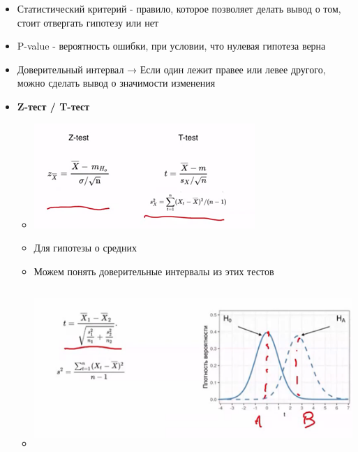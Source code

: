 \documentclass[a4paper, 12pt]{article}
\begin{document}
\begin{itemize}
\item
  
  Статистический критерий - правило, которое позволяет делать вывод о
  том, стоит отвергать гипотезу или нет
  
\item
  
  P-value - вероятность ошибки, при условии, что нулевая гипотеза верна
  
\item
  
  Доверительный интервал → Если один лежит правее или левее другого,
  можно сделать вывод о значимости изменения
  
\item
  
  \textbf{Z-тест / T-тест}
  

  \begin{itemize}
  \item
    
    \includegraphics[width=3.29167in,height=1.56443in]{media/image18.png}
    
  \item
    
    Для гипотезы о средних
    
  \item
    
    Можем понять доверительные интервалы из этих тестов
    
  \item
    
    \includegraphics[width=5.38962in,height=2.37382in]{media/image13.png}
    

\end{itemize}
\end{itemize}
\end{document}
